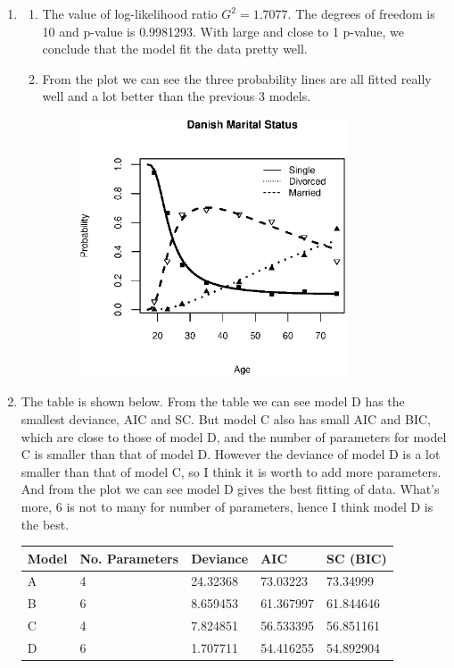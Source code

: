 \documentclass{article}
\begin{document}
\begin{enumerate}[leftmargin = 0 em, label = \arabic*., font = \bfseries]
\begin{enumerate}
\newpage
		\item 
		\begin{enumerate}
			\item The value of log-likelihood ratio $G^2 = 1.7077$. The degrees of freedom is 10 and p-value is 0.9981293. With large and close to 1 p-value, we conclude that the model fit the data pretty well.
		\item From the plot we can see the three probability lines are all fitted really well and a lot better than the previous 3 models. 
						\begin{figure}[!htb]
					\centering
					\includegraphics[width = 0.8\textwidth]{2D.eps}
				\end{figure}

		\end{enumerate}
		
		\item The table is shown below. From the table we can see model D has the smallest deviance, AIC and SC. But model C also has small AIC and BIC, which are close to those of model D, and the number of parameters for model C is smaller than that of model D. However the deviance of model D is a lot smaller than that of model C, so I think it is worth to add more parameters. And from the plot we can see model D gives the best fitting of data. What's more, 6 is not to many for number of parameters, hence I think model D is the best.  

		\begin{center}
		\begin{tabular}{lllll}
				 \toprule
				 Model & No. Parameters & Deviance & AIC & SC (BIC)\\
				 \midrule
				 A & 4 &  24.32368 &73.03223 & 73.34999 \\
				 B & 6 &  8.659453 &61.367997& 61.844646\\
				 C & 4 &  7.824851 &56.533395& 56.851161\\
				 D & 6 &  1.707711 &54.416255& 54.892904\\
				 \bottomrule
				\end{tabular}
		\end{center}
        

\end{enumerate}
\end{enumerate}
\end{document}
